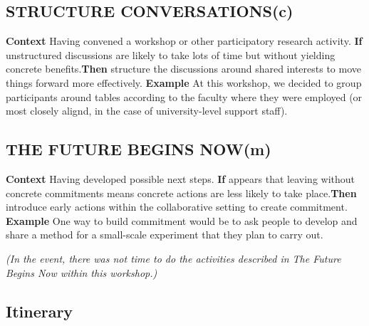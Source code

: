 \documentclass[acmlarge,timestamp]{acmart}
\newcommand{\cognitive}{(c)}
\newcommand{\motor}{(m)}
\begin{document}
\subsection*{STRUCTURE CONVERSATIONS{\hfill\cognitive}}
\textbf{Context} Having convened a workshop or other participatory research activity.\newline
\textbf{If} unstructured discussions are likely to take lots of time but without yielding concrete benefits.\newline \textbf{Then}
structure the discussions around shared interests to move things forward more effectively.\newline
\textbf{Example} At this workshop, we decided to group participants around tables according to the faculty where they were employed (or most closely alignd, in the case of university-level support staff).

\subsection*{THE FUTURE BEGINS NOW{\hfill\motor}}
\textbf{Context} Having developed possible next steps.\newline
\textbf{If} appears that leaving without concrete commitments means
concrete actions are less likely to take place.\newline \textbf{Then}
introduce early actions within the
collaborative setting to create commitment.\newline
\textbf{Example} One way to build commitment would be to ask people to develop and share a method for a small-scale experiment that they plan to carry out.

\smallskip
\noindent \emph{(In the event, there was not time to do the activities described
in {\sc The Future Begins Now} within this workshop.)}
\clearpage

\subsection{Itinerary}
\end{document}
